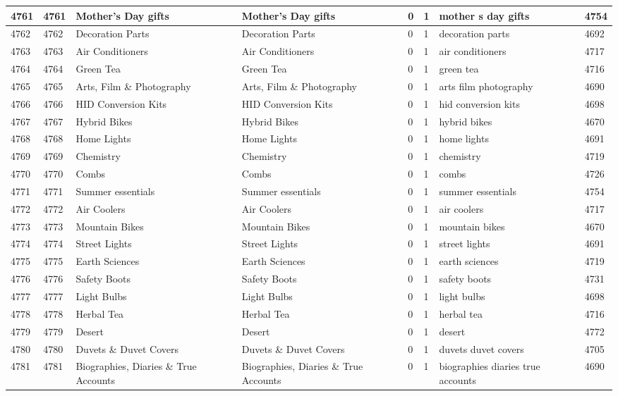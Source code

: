 \begin{longtable}{|l|l|l|l|l|l|l|l|}
4761 & 4761 & Mother's Day gifts & Mother's Day gifts & 0 & 1 & mother s day gifts & 4754 \\ \hline 
4762 & 4762 & Decoration Parts & Decoration Parts & 0 & 1 & decoration parts & 4692 \\ \hline 
4763 & 4763 & Air Conditioners & Air Conditioners & 0 & 1 & air conditioners & 4717 \\ \hline 
4764 & 4764 & Green Tea & Green Tea & 0 & 1 & green tea & 4716 \\ \hline 
4765 & 4765 & Arts, Film \& Photography & Arts, Film \& Photography & 0 & 1 & arts film photography & 4690 \\ \hline 
4766 & 4766 & HID Conversion Kits & HID Conversion Kits & 0 & 1 & hid conversion kits & 4698 \\ \hline 
4767 & 4767 & Hybrid Bikes & Hybrid Bikes & 0 & 1 & hybrid bikes & 4670 \\ \hline 
4768 & 4768 & Home Lights & Home Lights & 0 & 1 & home lights & 4691 \\ \hline 
4769 & 4769 & Chemistry & Chemistry & 0 & 1 & chemistry & 4719 \\ \hline 
4770 & 4770 & Combs & Combs & 0 & 1 & combs & 4726 \\ \hline 
4771 & 4771 & Summer essentials & Summer essentials & 0 & 1 & summer essentials & 4754 \\ \hline 
4772 & 4772 & Air Coolers & Air Coolers & 0 & 1 & air coolers & 4717 \\ \hline 
4773 & 4773 & Mountain Bikes & Mountain Bikes & 0 & 1 & mountain bikes & 4670 \\ \hline 
4774 & 4774 & Street Lights & Street Lights & 0 & 1 & street lights & 4691 \\ \hline 
4775 & 4775 & Earth Sciences & Earth Sciences & 0 & 1 & earth sciences & 4719 \\ \hline 
4776 & 4776 & Safety Boots & Safety Boots & 0 & 1 & safety boots & 4731 \\ \hline 
4777 & 4777 & Light Bulbs & Light Bulbs & 0 & 1 & light bulbs & 4698 \\ \hline 
4778 & 4778 & Herbal Tea & Herbal Tea & 0 & 1 & herbal tea & 4716 \\ \hline 
4779 & 4779 & Desert & Desert & 0 & 1 & desert & 4772 \\ \hline 
4780 & 4780 & Duvets \& Duvet Covers & Duvets \& Duvet Covers & 0 & 1 & duvets duvet covers & 4705 \\ \hline 
4781 & 4781 & Biographies, Diaries \& True Accounts & Biographies, Diaries \& True Accounts & 0 & 1 & biographies diaries true accounts & 4690 \\ \hline 

\end{longtable}
